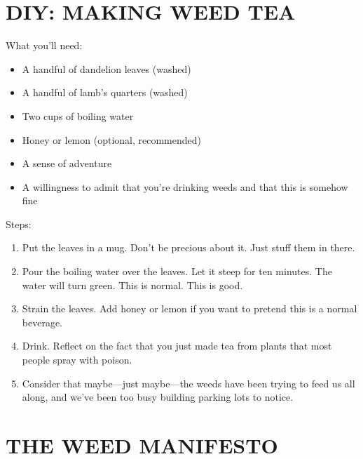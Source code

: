 \documentclass[
    language=english,
    doctype=zine,
    institution=none,
]{../../omnilatex}
\begin{document}
\section*{DIY: MAKING WEED TEA}

What you'll need:
\begin{itemize}
    \item A handful of dandelion leaves (washed)
    \item A handful of lamb's quarters (washed)
    \item Two cups of boiling water
    \item Honey or lemon (optional, recommended)
    \item A sense of adventure
    \item A willingness to admit that you're drinking weeds and that this is somehow fine
\end{itemize}

Steps:
\begin{enumerate}
    \item Put the leaves in a mug. Don't be precious about it. Just stuff them in there.
    \item Pour the boiling water over the leaves. Let it steep for ten minutes. The water will turn green. This is normal. This is good.
    \item Strain the leaves. Add honey or lemon if you want to pretend this is a normal beverage.
    \item Drink. Reflect on the fact that you just made tea from plants that most people spray with poison.
    \item Consider that maybe---just maybe---the weeds have been trying to feed us all along, and we've been too busy building parking lots to notice.
\end{enumerate}

\section*{THE WEED MANIFESTO}
\end{document}
